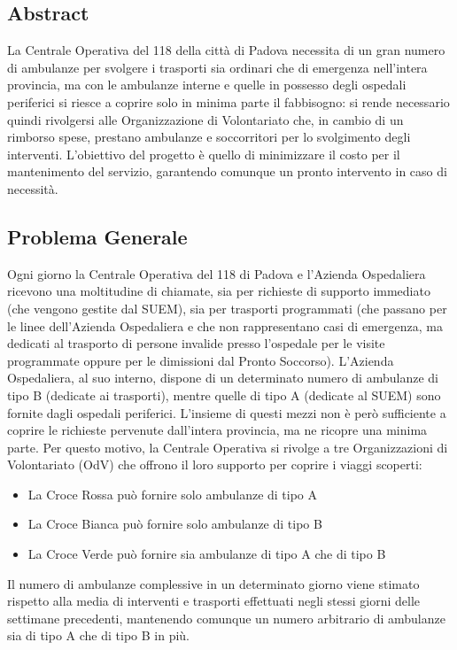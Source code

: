 \subsection{Abstract}
La Centrale Operativa del 118 della città di Padova necessita di un gran numero di ambulanze per svolgere i trasporti sia ordinari che di emergenza nell’intera provincia, ma con le ambulanze interne e quelle in possesso degli ospedali periferici si riesce a coprire solo in minima parte il fabbisogno: si rende necessario quindi rivolgersi alle Organizzazione di Volontariato che, in cambio di un rimborso spese, prestano ambulanze e soccorritori per lo svolgimento degli interventi. 
L’obiettivo del progetto è quello di minimizzare il costo per il mantenimento del servizio, garantendo comunque un pronto intervento in caso di necessità. 

\subsection{Problema Generale}
Ogni giorno la Centrale Operativa del 118 di Padova e l'Azienda Ospedaliera ricevono una moltitudine di chiamate, sia per richieste di supporto immediato (che vengono gestite dal SUEM), sia per trasporti programmati (che passano per le linee dell'Azienda Ospedaliera e che non rappresentano casi di emergenza, ma dedicati al trasporto di persone invalide presso l'ospedale per le visite programmate oppure per le dimissioni dal Pronto Soccorso).
\newline \newline
L'Azienda Ospedaliera, al suo interno, dispone di un determinato numero di ambulanze di tipo B (dedicate ai trasporti), mentre quelle di tipo A (dedicate al SUEM) sono fornite dagli ospedali periferici. L'insieme di questi mezzi non è però sufficiente a coprire le richieste pervenute dall'intera provincia, ma ne ricopre una minima parte. Per questo motivo, la Centrale Operativa si rivolge a tre Organizzazioni di Volontariato (OdV) che offrono il loro supporto per coprire i viaggi scoperti:
\begin{itemize}
    \item La Croce Rossa può fornire solo ambulanze di tipo A
    \item La Croce Bianca può fornire solo ambulanze di tipo B
    \item La Croce Verde può fornire sia ambulanze di tipo A che di tipo B
\end{itemize}
Il numero di ambulanze complessive in un determinato giorno viene stimato rispetto alla media di interventi e trasporti effettuati negli stessi giorni delle settimane precedenti, mantenendo comunque un numero arbitrario di ambulanze sia di tipo A che di tipo B in più.
